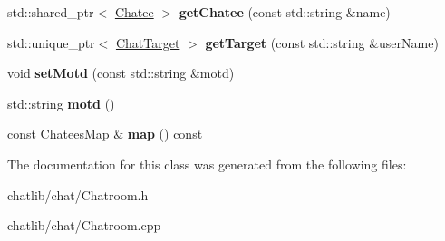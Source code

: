 \begin{DoxyCompactItemize}
\item 
\hypertarget{classSimpleChat_1_1Chatroom_a9c62326ce13b8406d6bc2e3aed7e2fd6}{std\-::shared\-\_\-ptr$<$ \hyperlink{classSimpleChat_1_1Chatee}{Chatee} $>$ {\bfseries get\-Chatee} (const std\-::string \&name)}\label{classSimpleChat_1_1Chatroom_a9c62326ce13b8406d6bc2e3aed7e2fd6}

\item 
\hypertarget{classSimpleChat_1_1Chatroom_ab6fdbdb57658dc86adfd5cf3917f25b0}{std\-::unique\-\_\-ptr$<$ \hyperlink{classSimpleChat_1_1ChatTarget}{Chat\-Target} $>$ {\bfseries get\-Target} (const std\-::string \&user\-Name)}\label{classSimpleChat_1_1Chatroom_ab6fdbdb57658dc86adfd5cf3917f25b0}

\item 
\hypertarget{classSimpleChat_1_1Chatroom_a551e00f5e376b0e8b158ba4fed5385b6}{void {\bfseries set\-Motd} (const std\-::string \&motd)}\label{classSimpleChat_1_1Chatroom_a551e00f5e376b0e8b158ba4fed5385b6}

\item 
\hypertarget{classSimpleChat_1_1Chatroom_a35c8905dbcc8f9426afe23266f9ea573}{std\-::string {\bfseries motd} ()}\label{classSimpleChat_1_1Chatroom_a35c8905dbcc8f9426afe23266f9ea573}

\item 
\hypertarget{classSimpleChat_1_1Chatroom_a32993b493fa3e141f5cae6ef757fd53e}{const Chatees\-Map \& {\bfseries map} () const }\label{classSimpleChat_1_1Chatroom_a32993b493fa3e141f5cae6ef757fd53e}

\end{DoxyCompactItemize}


The documentation for this class was generated from the following files\-:\begin{DoxyCompactItemize}
\item 
chatlib/chat/Chatroom.\-h\item 
chatlib/chat/Chatroom.\-cpp\end{DoxyCompactItemize}
